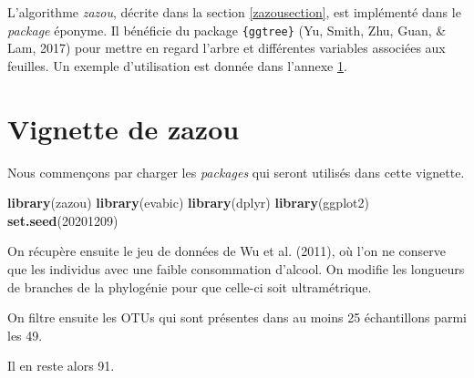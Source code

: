 \documentclass[12pt,a4paper]{reedthesis}
\newenvironment{Shaded}{\begin{snugshade}}{\end{snugshade}}
\newcommand{\DecValTok}[1]{\textcolor[rgb]{0.00,0.00,0.81}{#1}}
\newcommand{\KeywordTok}[1]{\textcolor[rgb]{0.13,0.29,0.53}{\textbf{#1}}}
\newcommand{\NormalTok}[1]{#1}
\newcommand{\OperatorTok}[1]{\textcolor[rgb]{0.81,0.36,0.00}{\textbf{#1}}}
\newcommand{\StringTok}[1]{\textcolor[rgb]{0.31,0.60,0.02}{#1}}
\theoremstyle{definition}
\theoremstyle{definition}
\theoremstyle{definition}
\theoremstyle{remark}
\begin{document}
L'algorithme \emph{zazou}, décrite dans la section \ref{zazousection}, est implémenté dans le \emph{package} éponyme. Il bénéficie du package \texttt{\{ggtree\}} (Yu, Smith, Zhu, Guan, \& Lam, 2017) pour mettre en regard l'arbre et différentes variables associées aux feuilles. Un exemple d'utilisation est donnée dans l'annexe \ref{vignette}.

\hypertarget{vignette}{%
\chapter{Vignette de zazou}\label{vignette}}

Nous commençons par charger les \emph{packages} qui seront utilisés dans cette vignette.
\begin{Shaded}
\begin{Highlighting}[]
\KeywordTok{library}\NormalTok{(zazou)}
\KeywordTok{library}\NormalTok{(evabic)}
\KeywordTok{library}\NormalTok{(dplyr)}
\KeywordTok{library}\NormalTok{(ggplot2)}
\KeywordTok{set.seed}\NormalTok{(}\DecValTok{20201209}\NormalTok{)}
\end{Highlighting}
\end{Shaded}
On récupère ensuite le jeu de données de Wu et al. (2011), où l'on ne conserve que les individus avec une faible consommation d'alcool. On modifie les longueurs de branches de la phylogénie pour que celle-ci soit ultramétrique.
\begin{Shaded}
\end{Shaded}
On filtre ensuite les OTUs qui sont présentes dans au moins 25 échantillons parmi les 49.
\begin{Shaded}
\end{Shaded}
Il en reste alors 91.
\end{document}
